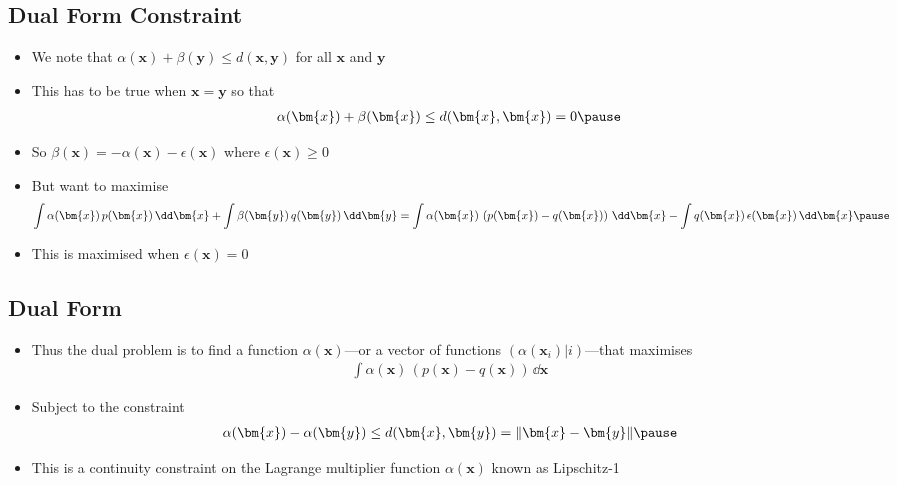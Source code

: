 \begin{slide}
\section{Dual Form Constraint}

\begin{PauseHighLight}
  \begin{itemize}
  \item We note that $\alpha(\bm{x}) + \beta(\bm{y}) \leq d(\bm{x},\bm{y})$ for
    all $\bm{x}$ and $\bm{y}$\pause
  \item This has to be true when $\bm{x}=\bm{y}$ so that
    \begin{align*}
      \alpha(\bm{x}) + \beta(\bm{x}) \leq d(\bm{x},\bm{x}) = 0\pause
    \end{align*}
  \item So $\beta(\bm{x}) = -\alpha(\bm{x}) - \epsilon(\bm{x})$ where
    $\epsilon(\bm{x})\geq0$\pause
  \item But want to maximise {\small
    \begin{align*}
      \int \alpha(\bm{x})\,p(\bm{x})\, \dd \bm{x} + \int
      \beta(\bm{y})\,q(\bm{y})\,\dd \bm{y}
      = \int \alpha(\bm{x})\,\left(p(\bm{x}) - q(\bm{x})\right) \, \dd
      \bm{x} - \int q(\bm{x}) \, \epsilon(\bm{x}) \,\dd\bm{x} \pause
    \end{align*}}
  \item This is maximised when $\epsilon(\bm{x})=0$\pause
  \end{itemize}
\end{PauseHighLight}

\end{slide}


\begin{slide}
\section{Dual Form}

\begin{PauseHighLight}
  \begin{itemize}
  \item Thus the dual problem is to find a function $\alpha(\bm{x})$---or a
    vector of functions $(\alpha(\bm{x}_i)|i)$---that maximises
    \begin{align*}
      \int \alpha(\bm{x})\,\left(p(\bm{x}) - q(\bm{x})\right) \, \dd \bm{x}
    \end{align*}
  \item Subject to the constraint
    \begin{align*}
      \alpha(\bm{x}) - \alpha(\bm{y}) \leq d(\bm{x},\bm{y}) = \| \bm{x}-\bm{y} \|\pause
    \end{align*}
  \item This is a continuity constraint on the Lagrange multiplier
    function $\alpha(\bm{x})$ known as Lipschitz-1\pause
  \end{itemize}
\end{PauseHighLight}

\end{slide}

